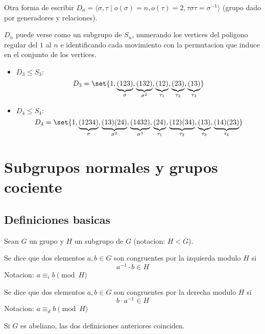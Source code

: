 \begin{remark}
	Otra forma de escribir \(D_n = \langle \sigma, \tau \mid o(\sigma) = n, o(\tau) = 2, \tau \sigma \tau = \sigma^{-1} \rangle \) (grupo dado por generadores y relaciones).
\end{remark}
\begin{remark}
	\(D_n \) puede verse como un subgrupo de \(S_n \), numerando los vertices del poligono regular del \( 1\) al \(n \) e identificando cada movimiento con la permutacion que induce en el conjunto de los vertices.
\end{remark}
\begin{example}
	\begin{itemize}
		\item \(D_3 \leq S_3 : \)
		      \[
			      D_3 = \set{1, \underbrace{(123)}_{\sigma}, \underbrace{(132)}_{\sigma^{2}}, \underbrace{(12)}_{\tau_1}, \underbrace{(23)}_{\tau_2}, \underbrace{(13)}_{\tau_3}}
		      \]
		\item \(D_4 \leq S_4 : \)
		      \[
			      D_4 = \set{1, \underbrace{(1234)}_{\sigma}, \underbrace{(13)(24)}_{\sigma^{2}}, \underbrace{(1432)}_{\sigma^{3}}, \underbrace{(24)}_{\tau_1}, \underbrace{(12)(34)}_{\tau_2}, \underbrace{(13)}_{\tau_3}, \underbrace{(14)(23)}_{\tau_4}}
		      \]
	\end{itemize}
\end{example}

\section{Subgrupos normales y grupos cociente}
\subsection{Definiciones basicas}
\begin{definition}
	\label{relaciones}
	Sean \(G \) un grupo y \(H\) un subgrupo de \(G \) (notacion: \(H < G \)).
	
	Se dice que dos elementos \(a,b \in G \) son congruentes por la izquierda modulo \(H \) si
	\[
		a^{-1} \cdot b \in H
	\]
	Notacion: \(a \equiv_i b \pmod H \)
	
	Se dice que dos elementos \(a,b \in G \) son congruentes por la derecha modulo \(H \) si
	\[
		b \cdot a^{-1}  \in H
	\]
	Notacion: \(a \equiv_d b \pmod H \)
\end{definition}

\begin{remark}
	Si \(G \) es abeliano, las dos definiciones anteriores coinciden.
\end{remark}

